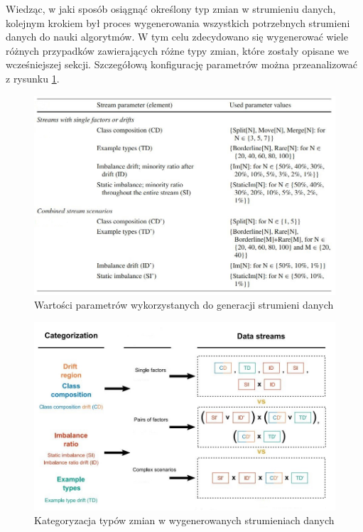 \noindent Wiedząc, w jaki sposób osiągnąć określony typ zmian w strumieniu danych, kolejnym krokiem był proces wygenerowania wszystkich potrzebnych strumieni danych do nauki algorytmów. W tym celu zdecydowano się wygenerować wiele różnych przypadków zawierających różne typy zmian, które zostały opisane we wcześniejszej sekcji. Szczegółową konfigurację parametrów można przeanalizować z rysunku \ref{Figure:DriftParameters}.

\begin{figure}[h] 
    \centering
    \includegraphics[width=15cm]{figures/drift_parameters.JPG}
    \caption{Wartości parametrów wykorzystanych do generacji strumieni danych \cite{Article:TypyPrzykladow}}\label{Figure:DriftParameters}
\end{figure}

\begin{figure}[h] 
    \centering
    \includegraphics[width=13cm]{figures/drift_categorization.JPG}
    \caption{Kategoryzacja typów zmian w wygenerowanych strumieniach danych \cite{Article:TypyPrzykladow}}\label{Figure:DriftCategorization}
\end{figure}

